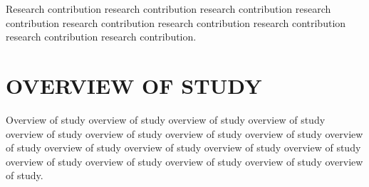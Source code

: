 Research contribution research contribution research contribution
research contribution research contribution research contribution
research contribution research contribution research contribution.

\section{OVERVIEW OF STUDY}

Overview of study overview of study overview of study overview of
study overview of study overview of study overview of study overview
of study overview of study overview of study overview of study
overview of study overview of study overview of study overview of
study overview of study overview of study overview of study.

